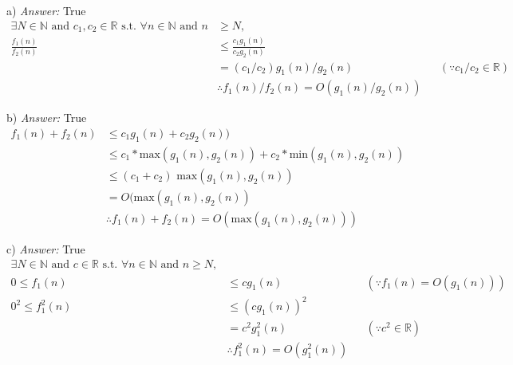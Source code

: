 \documentclass[12pt]{article}
\begin{document}
a) \textit{Answer: } True
\begin{align*}
\exists N \in \mathbb{N} \text{ and } c_1,c_2 \in \mathbb{R} \text{ s.t. } \forall n \in \mathbb{N} \text{ and } n &\geq N, \\
\frac{f_1(n)}{f_2(n)} &\leq \frac{c_1g_1(n)}{c_2g_2(n)}\\
&= (c_1/c_2) g_1(n)/g_2(n) && (\because c_1/c_2 \in \mathbb{R})\\
&\therefore f_1(n)/f_2(n) = O(g_1(n)/g_2(n))
\end{align*}

b) \textit{Answer: } True
\begin{align*}
f_1(n)+f_2(n)&\leq c_1 g_1(n)+c_2 g_2(n))\\
&\leq c_1*\text{max}(g_1(n),g_2(n)) + c_2*\text{min}(g_1(n),g_2(n))\\
&\leq (c_1+c_2)\text{ max}(g_1(n),g_2(n)) \\
&=O(\text{max}(g_1(n),g_2(n))\\
&\therefore f_1(n)+f_2(n) = O(\text{max}(g_1(n), g_2(n)))
\end{align*}

c) \textit{Answer: } True
\begin{align*}
\exists N \in \mathbb{N} \text{ and } c \in \mathbb{R} \text{ s.t. } \forall n \in \mathbb{N} \text{ and } n \geq N, \\
0 \leq f_1(n) &\leq c g_1(n) && (\because f_1(n)=O(g_1(n))) \\
0^2 \leq f_1^2(n) &\leq (cg_1(n))^2\\
&= c^2 g_1^2(n) &&(\because c^2\in\mathbb{R})\\
&\therefore f_1^2(n) = O(g_1^2(n))
\end{align*}
\end{document}
